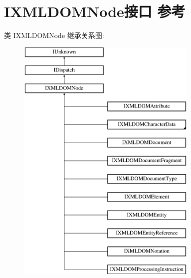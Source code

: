 \hypertarget{interface_i_x_m_l_d_o_m_node}{}\section{I\+X\+M\+L\+D\+O\+M\+Node接口 参考}
\label{interface_i_x_m_l_d_o_m_node}
类 I\+X\+M\+L\+D\+O\+M\+Node 继承关系图\+:\begin{figure}[H]
\begin{center}
\leavevmode
\includegraphics[height=12.000000cm]{interface_i_x_m_l_d_o_m_node}
\end{center}
\end{figure}
